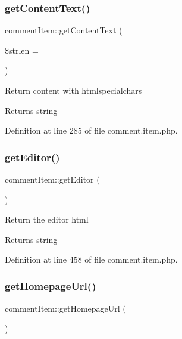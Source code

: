 \subsubsection{\texorpdfstring{get\+Content\+Text()}{getContentText()}}
{\footnotesize\ttfamily comment\+Item\+::get\+Content\+Text (\begin{DoxyParamCaption}\item[{}]{\$strlen = {} }\end{DoxyParamCaption})}

Return content with htmlspecialchars \begin{DoxyReturn}{Returns}
string 
\end{DoxyReturn}


Definition at line 285 of file comment.\+item.\+php.

\hypertarget{classcommentItem_aa27b1c1916b9df510c495655af07bfdf}{}\label{classcommentItem_aa27b1c1916b9df510c495655af07bfdf} 
\subsubsection{\texorpdfstring{get\+Editor()}{getEditor()}}
{\footnotesize\ttfamily comment\+Item\+::get\+Editor (\begin{DoxyParamCaption}{ }\end{DoxyParamCaption})}

Return the editor html \begin{DoxyReturn}{Returns}
string 
\end{DoxyReturn}


Definition at line 458 of file comment.\+item.\+php.

\hypertarget{classcommentItem_ad10d90cb7e49989d7a43956886d8e2e8}{}\label{classcommentItem_ad10d90cb7e49989d7a43956886d8e2e8} 
\subsubsection{\texorpdfstring{get\+Homepage\+Url()}{getHomepageUrl()}}
{\footnotesize\ttfamily comment\+Item\+::get\+Homepage\+Url (\begin{DoxyParamCaption}{ }\end{DoxyParamCaption})}



